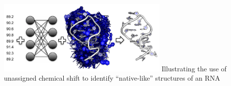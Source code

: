 \documentclass[journal=jcisd8,manuscript=article,layout=onecolumn]{achemso}
\begin{document}



\begin{tocentry}
\centering
\includegraphics[width=3.3in]{toc}
Illustrating the use of unassigned chemical shift  to identify ``native-like'' structures of an RNA
\end{tocentry}
\end{document}
